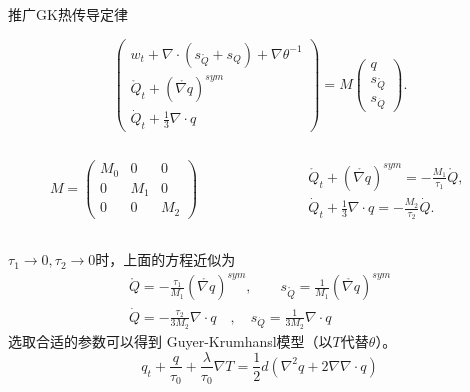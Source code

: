 \documentclass[mathserif]{beamer}
\begin{document}
\begin{frame}

\begin{block}{推广GK热传导定律}

\begin{equation*}
\left( \begin{array}{ll} {w}_t+\nabla \cdot (s_{\mathring{{Q}}}+s_Q)+\nabla \theta^{-1} \\ \mathring{{Q}}_t+(\mathring{\nabla {q}})^{sym} \\ \dot{Q}_t+\frac{1}{3} \nabla \cdot {q} \end{array} \right) = M \left( \begin{array}{l} {q} \\ s_{\mathring{{Q}}} \\s_{\dot{Q}} \end{array} \right).
\end{equation*}
\end{block}
\pause

{\small
\begin{columns}
\begin{column}{0.3\linewidth}
\begin{equation*}
	M=\left( \begin{array}{lll} M_0 & 0 & 0 \\0 & M_1 & 0 \\0 & 0 & M_2 \end{array} \right)
\end{equation*}
\end{column}
\pause
\begin{column}{0.7\linewidth}
\begin{eqnarray*}
\mathring{{Q}}_t+(\mathring{\nabla {q}})^{sym}=-\frac{M_1}{\tau_1}\mathring{{Q}}, \\
\dot{Q}_t+\frac{1}{3} \nabla \cdot {q}=-\frac{M_2}{\tau_2}\dot{Q}.
\end{eqnarray*}
\end{column}
\end{columns}
\pause
 $\tau_1 \to 0, \tau_2 \to 0$时，上面的方程近似为
\begin{eqnarray*} 
\mathring{{Q}}=-\frac{\tau_1}{M_1}(\mathring{\nabla {q}})^{sym} ,\quad  \quad s_{\mathring{Q}}=\frac{1}{M_1}(\mathring{\nabla {q}})^{sym} \\
\dot{Q}=-\frac{\tau_2}{3M_2}\nabla \cdot {q} \quad , \quad s_{\dot{Q}}=\frac{1}{3M_2} \nabla \cdot {q}
\end{eqnarray*}
\pause
选取合适的参数可以得到
Guyer-Krumhansl模型（以$T$代替$\theta$）。%
\begin{equation*}
{q}_t+\frac{{q}}{\tau_0}+\frac{\lambda}{\tau_0}\nabla T=\frac{1}{2}d(\nabla^2 {q}+2\nabla \nabla \cdot {q})
\end{equation*}}


\end{frame}
\end{document}
